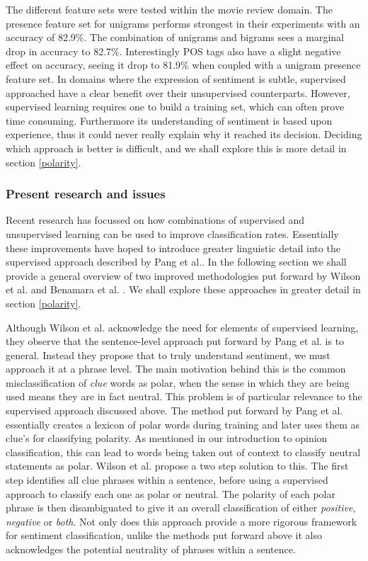 The different feature sets were tested within the movie review domain. The presence feature set for unigrams performs strongest in their experiments with an accuracy of 82.9\%. The combination of unigrams and bigrams sees a marginal drop in accuracy to 82.7\%. Interestingly POS tags also have a slight negative effect on accuracy, seeing it drop to 81.9\% when coupled with a unigram presence feature set. In domains where the expression of sentiment is subtle, supervised approached have a clear benefit over their unsupervised counterparts. However, supervised learning requires one to build a training set, which can often prove time consuming. Furthermore its understanding of sentiment is based upon experience, thus it could never really explain why it reached its decision. Deciding which approach is better is difficult, and we shall explore this is more detail in section \ref{polarity}.

\subsubsection{Present research and issues}

Recent research has focussed on how combinations of supervised and unsupervised learning can be used to improve classification rates. Essentially these improvements have hoped to introduce greater linguistic detail into the supervised approach described by Pang et al.. In the following section we shall provide a general overview of two improved methodologies put forward by Wilson et al. \cite{Wilson:2005tt} and Benamara et al. \cite{Benamara:2007wz}.  We shall explore these approaches in greater detail in section \ref{polarity}.

Although Wilson et al. \cite{Wilson:2005tt} acknowledge the need for elements of supervised learning, they observe that the sentence-level approach put forward by Pang et al. is to general. Instead they propose that to truly understand sentiment, we must approach it at a phrase level. The main motivation behind this is the common misclassification of \emph{clue} words as polar, when the sense in which they are being used means they are in fact neutral. This problem is of particular relevance to the supervised approach discussed above. The method put forward by Pang et al. essentially creates a lexicon of polar words during training and later uses them as clue's for classifying polarity. As mentioned in our introduction to opinion classification, this can lead to words being taken out of context to classify neutral statements as polar. Wilson et al. propose a two step solution to this. The first step identifies all clue phrases within a sentence, before using a supervised approach to classify each one as polar or neutral. The polarity of each polar phrase is then disambiguated to give it an overall classification of either \emph{positive}, \emph{negative} or \emph{both}. Not only does this approach provide a more rigorous framework for sentiment classification, unlike the methods put forward above it also acknowledges the potential neutrality of phrases within a sentence.

